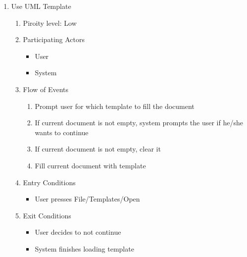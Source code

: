 \documentclass[a4paper, 12pt]{article}
\begin{document}
\begin{enumerate}
\item Use UML Template
  \begin {enumerate}
  \item Piroity level: Low
  \item Participating Actors
    \begin {itemize}
    \item User
    \item System
    \end {itemize}
  \item Flow of Events
    \begin {enumerate}
    \item Prompt user for which template to fill the document
    \item If current document is not empty, system prompts the user if he/she wants to continue
    \item If current document is not empty, clear it
    \item Fill current document with template
    \end {enumerate}
  \item Entry Conditions
    \begin{itemize}
    \item User presses File/Templates/Open
    \end {itemize}
  \item Exit Conditions
    \begin {itemize}
    \item User decides to not continue
    \item System finishes loading template
    \end {itemize}
  \end {enumerate}
\end {enumerate}
\end{document}
